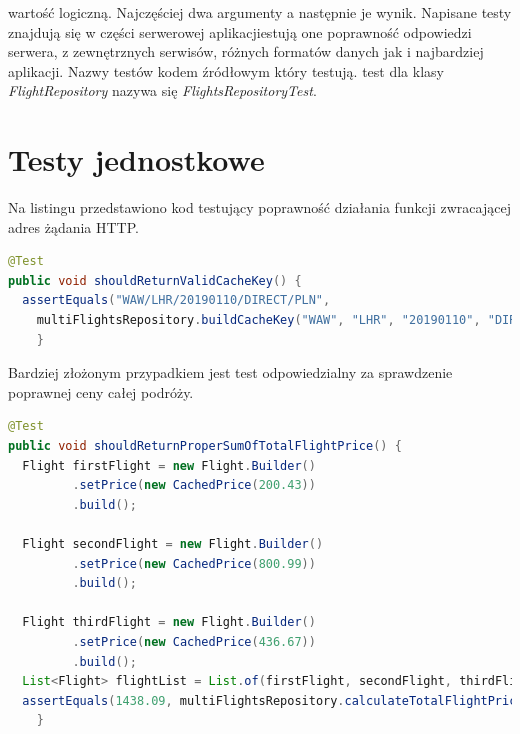 \documentclass[12pt, twoside]{report}
\begin{document}
  wartość logiczną. Najczęściej  dwa argumenty a następnie  je  wynik\cite{assertion}. Napisane testy znajdują się w części serwerowej aplikacjiestują one poprawność odpowiedzi serwera,  z zewnętrznych serwisów,  różnych formatów danych jak i najbardziej  aplikacji.  Nazwy testów kodem źródłowym który testują.  test dla klasy \textit{FlightRepository}  nazywa się \textit{FlightsRepositoryTest}.

\section{Testy jednostkowe}
 Na  listingu \add{\ldots} przedstawiono  kod testujący poprawność działania funkcji zwracającej adres żądania HTTP.
\begin{lstlisting}[language=java, caption=Przykładowy test jednostkowy]
@Test
public void shouldReturnValidCacheKey() {
  assertEquals("WAW/LHR/20190110/DIRECT/PLN",
    multiFlightsRepository.buildCacheKey("WAW", "LHR", "20190110", "DIRECT", "PLN"));
    }
\end{lstlisting}
Bardziej złożonym przypadkiem jest test odpowiedzialny za sprawdzenie poprawnej ceny całej podróży.
\begin{lstlisting}[language=java, caption=Przykładowy test jednostkowy]
@Test
public void shouldReturnProperSumOfTotalFlightPrice() {
  Flight firstFlight = new Flight.Builder()
         .setPrice(new CachedPrice(200.43))
         .build();
 
  Flight secondFlight = new Flight.Builder()
         .setPrice(new CachedPrice(800.99))
         .build();

  Flight thirdFlight = new Flight.Builder()
         .setPrice(new CachedPrice(436.67))
         .build();
  List<Flight> flightList = List.of(firstFlight, secondFlight, thirdFlight);
  assertEquals(1438.09, multiFlightsRepository.calculateTotalFlightPrice(flightList), 0.001);
    }
\end{lstlisting}
\end{document}
